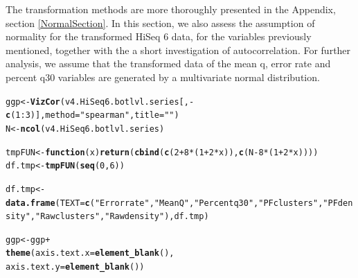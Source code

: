 \documentclass[a4paper,11pt,fleqn,twoside,notitlepage]{report}
\makeatletter
\newcommand{\hlnum}[1]{\textcolor[rgb]{0.686,0.059,0.569}{#1}}%
\newcommand{\hlstr}[1]{\textcolor[rgb]{0.192,0.494,0.8}{#1}}%
\newcommand{\hlopt}[1]{\textcolor[rgb]{0,0,0}{#1}}%
\newcommand{\hlstd}[1]{\textcolor[rgb]{0.345,0.345,0.345}{#1}}%
\newcommand{\hlkwa}[1]{\textcolor[rgb]{0.161,0.373,0.58}{\textbf{#1}}}%
\newcommand{\hlkwb}[1]{\textcolor[rgb]{0.69,0.353,0.396}{#1}}%
\newcommand{\hlkwc}[1]{\textcolor[rgb]{0.333,0.667,0.333}{#1}}%
\newcommand{\hlkwd}[1]{\textcolor[rgb]{0.737,0.353,0.396}{\textbf{#1}}}%
\newenvironment{kframe}{%
 \def\at@end@of@kframe{}%
 \ifinner\ifhmode%
  \def\at@end@of@kframe{\end{minipage}}%
  \begin{minipage}{\columnwidth}%
 \fi\fi%
 \def\FrameCommand##1{\hskip\@totalleftmargin \hskip-\fboxsep
 \colorbox{shadecolor}{##1}\hskip-\fboxsep
     \hskip-\linewidth \hskip-\@totalleftmargin \hskip\columnwidth}%
 \MakeFramed {\advance\hsize-\width
   \@totalleftmargin\z@ \linewidth\hsize
   \@setminipage}}%
 {\par\unskip\endMakeFramed%
 \at@end@of@kframe}
\newenvironment{knitrout}{}{} %
\makeatother
\begin{document}
The transformation methods are more thoroughly presented in the Appendix, section \ref{NormalSection}. In this section, we also assess the assumption of normality for the transformed HiSeq 6 data, for the variables previously mentioned, together with the a short investigation of autocorrelation. For further analysis, we assume that the transformed data of the mean q, error rate and percent q30 variables are generated by a multivariate normal distribution. 
\begin{knitrout}
\color{fgcolor}\begin{kframe}
\begin{alltt}
\hlstd{ggp} \hlkwb{<-} \hlkwd{VizCor}\hlstd{(v4.HiSeq6.botlvl.series[,}\hlopt{-}\hlkwd{c}\hlstd{(}\hlnum{1}\hlopt{:}\hlnum{3}\hlstd{)],} \hlkwc{method}\hlstd{=}\hlstr{"spearman"}\hlstd{,}\hlkwc{title}\hlstd{=}\hlstr{""}\hlstd{)}
\hlstd{N} \hlkwb{<-} \hlkwd{ncol}\hlstd{(v4.HiSeq6.botlvl.series)}

\hlstd{tmpFUN} \hlkwb{<-} \hlkwa{function}\hlstd{(}\hlkwc{x}\hlstd{)} \hlkwd{return} \hlstd{(}\hlkwd{cbind}\hlstd{(}\hlkwd{c}\hlstd{(}\hlnum{2}\hlopt{+}\hlnum{8}\hlopt{*}\hlstd{(}\hlnum{1}\hlopt{+}\hlnum{2}\hlopt{*}\hlstd{x)),}\hlkwd{c}\hlstd{(N}\hlopt{-}\hlnum{8}\hlopt{*}\hlstd{(}\hlnum{1}\hlopt{+}\hlnum{2}\hlopt{*}\hlstd{x))))}
\hlstd{df.tmp} \hlkwb{<-} \hlkwd{tmpFUN}\hlstd{(}\hlkwd{seq}\hlstd{(}\hlnum{0}\hlstd{,}\hlnum{6}\hlstd{))}

\hlstd{df.tmp} \hlkwb{<-} \hlkwd{data.frame}\hlstd{(}\hlkwc{TEXT}\hlstd{=}\hlkwd{c}\hlstd{(}\hlstr{"Error rate"}\hlstd{,}\hlstr{"Mean Q"}\hlstd{,}\hlstr{"Percent q30"}\hlstd{,}\hlstr{"PF clusters"}\hlstd{,}\hlstr{"PF density"}\hlstd{,}\hlstr{"Raw clusters"}\hlstd{,}\hlstr{"Raw density"}\hlstd{),df.tmp)}

\hlstd{ggp} \hlkwb{<-} \hlstd{ggp} \hlopt{+}
   \hlkwd{theme}\hlstd{(}\hlkwc{axis.text.x} \hlstd{=} \hlkwd{element_blank}\hlstd{(),}
          \hlkwc{axis.text.y} \hlstd{=} \hlkwd{element_blank}\hlstd{())}


\end{alltt}
\end{kframe}
\end{knitrout}
\end{document}
